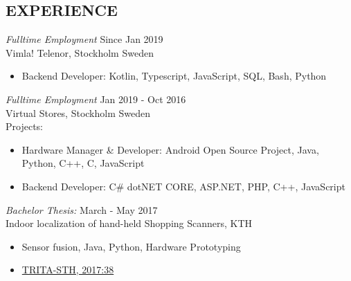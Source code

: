 \documentclass[margin]{res}
\begin{document}
\begin{resume}
 
\section{EXPERIENCE}
{\sl Fulltime Employment } \hfill Since Jan 2019 \\
                Vimla! Telenor, Stockholm Sweden
                \begin{itemize} \itemsep -3pt
                \item  Backend Developer: Kotlin, Typescript, JavaScript, SQL, Bash, Python\hfill 
                \end{itemize}
{\sl Fulltime Employment } \hfill Jan 2019 - Oct 2016 \\
                Virtual Stores, Stockholm Sweden \\ 
                Projects:
                \begin{itemize} \itemsep -3pt

                \item Hardware Manager \& Developer:  Android Open Source Project, Java, Python, C++, C, JavaScript\hfill 
                \item Backend Developer:  C\# dotNET CORE, ASP.NET, PHP, C++, JavaScript\hfill 
                \end{itemize}
{\sl Bachelor Thesis: } \hfill March - May 2017\\
Indoor localization of hand-held Shopping Scanners, KTH
 \begin{itemize} \itemsep -3pt
                \item Sensor fusion, Java, Python, Hardware Prototyping \hfill 
                \item \href{http://kth.diva-portal.org/smash/record.jsf?pid=diva2\%3A1108974}{TRITA-STH, 2017:38} \hfill 
                \end{itemize}


\end{resume}
\end{document}
